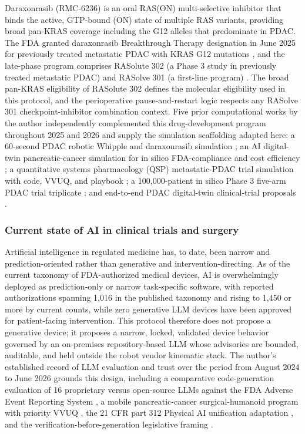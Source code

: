 Daraxonrasib (RMC-6236) is an oral RAS(ON) multi-selective inhibitor that binds
the active, GTP-bound (ON) state of multiple RAS variants, providing broad
pan-KRAS coverage including the G12 alleles that predominate in PDAC. The FDA
granted daraxonrasib Breakthrough Therapy designation in June 2025 for previously
treated metastatic PDAC with KRAS G12 mutations \cite{revbreakthrough}, and the
late-phase program comprises RASolute 302 (a Phase 3 study in previously treated
metastatic PDAC) and RASolve 301 (a first-line program) \cite{rasolute302}. The
broad pan-KRAS eligibility of RASolute 302 defines the molecular eligibility used
in this protocol, and the perioperative pause-and-restart logic respects any
RASolve 301 checkpoint-inhibitor combination context. Five prior computational
works by the author independently complemented this drug-development program
throughout 2025 and 2026 and supply the simulation scaffolding adapted here: a
60-second PDAC robotic Whipple and daraxonrasib simulation
\cite{kawchak_2026_20196639}; an AI digital-twin pancreatic-cancer simulation for
in silico FDA-compliance and cost efficiency \cite{kawchak_2025_17239510}; a
quantitative systems pharmacology (QSP) metastatic-PDAC trial simulation with code,
VVUQ, and playbook \cite{kawchak_2025_17001137}; a 100,000-patient in silico
Phase 3 five-arm PDAC trial triplicate \cite{kawchak_2025_16415815}; and
end-to-end PDAC digital-twin clinical-trial proposals \cite{kawchak_2025_15735068}.

\subsubsection*{Current state of AI in clinical trials and surgery}

Artificial intelligence in regulated medicine has, to date, been narrow and
prediction-oriented rather than generative and intervention-directing. As of the
current taxonomy of FDA-authorized medical devices, AI is overwhelmingly deployed
as prediction-only or narrow task-specific software, with reported authorizations
spanning 1,016 in the published taxonomy \cite{Singh2025} and rising to 1,450 or
more by current counts, while zero generative LLM devices have been approved for
patient-facing intervention. This protocol therefore does not propose a generative
device; it proposes a narrow, locked, validated device behavior governed by an
on-premises repository-based LLM whose advisories are bounded, auditable, and
held outside the robot vendor kinematic stack. The author's established record of
LLM evaluation and trust over the period from August 2024 to June 2026 grounds
this design, including a comparative code-generation evaluation of 16 proprietary
versus open-source LLMs against the FDA Adverse Event Reporting System
\cite{kawchak2025codegen16}, a mobile pancreatic-cancer surgical-humanoid program
with priority VVUQ \cite{kawchak2026unitree}, the 21 CFR part 312 Physical AI
unification adaptation \cite{kawchak2026adapt312}, and the
verification-before-generation legislative framing \cite{kawchak2026hr9510}.

